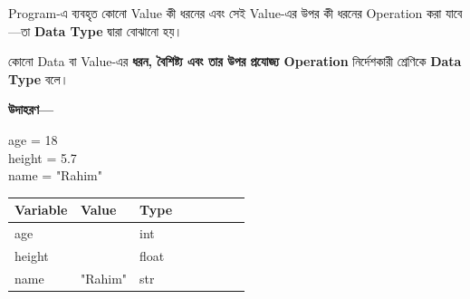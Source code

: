 
Program-এ ব্যবহৃত কোনো Value কী ধরনের এবং সেই Value-এর
উপর কী ধরনের Operation করা যাবে—তা
\textbf{Data Type} দ্বারা বোঝানো হয়।



\begin{definitionbox}
কোনো Data বা Value-এর
\textbf{ধরন, বৈশিষ্ট্য এবং তার উপর প্রযোজ্য Operation}
নির্দেশকারী শ্রেণিকে \textbf{Data Type} বলে।
\end{definitionbox}

\noindent
\begin{minipage}[t]{0.48\linewidth}

\textbf{উদাহরণ—}

\begin{codebox}
\begin{english}
\ttfamily
age = 18\\
height = 5.7\\
name = "Rahim"
\end{english}
\end{codebox}

\end{minipage}
\hfill
\begin{minipage}[t]{0.50\linewidth}

\begin{tabularx}
{\linewidth}
{
|>{\RaggedRight\arraybackslash}p{0.28\linewidth}
|>{\RaggedRight\arraybackslash}p{0.25\linewidth}
|Y|
}
\hline
{}

\textbf{Variable}
&
\textbf{Value}
&
\textbf{Type}
\\
\hline

\textenglish{\ttfamily age}
&
\textenglish{}
&
\textenglish{\ttfamily int}
\\
\hline

\textenglish{\ttfamily height}
&
\textenglish{}
&
\textenglish{\ttfamily float}
\\
\hline

\textenglish{\ttfamily name}
&
\textenglish{\ttfamily "Rahim"}
&
\textenglish{\ttfamily str}
\\
\hline
\end{tabularx}

\end{minipage}

